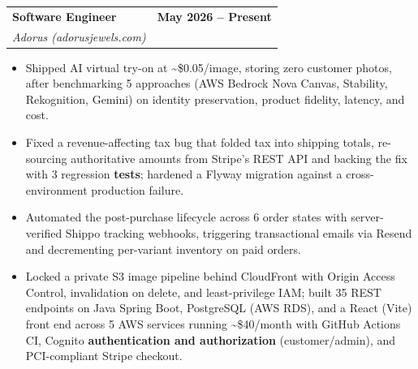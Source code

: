 \documentclass[letterpaper,10pt]{article}
\makeatletter
\newcommand{\nk}{\kern0pt}
\newcommand{\resumeItem}[1]{
  \item\small{
    {#1 \vspace{-3pt}}
  }
}
\newcommand{\resumeSubheading}[4]{
  \vspace{-2pt}\item
    \begin{tabular*}{0.97\textwidth}[t]{l@{\extracolsep{\fill}}r}
      \textbf{#1} & \textbf{#2} \\   %
      \textit{\small#3} & \textit{\small #4} \\
    \end{tabular*}\vspace{-7pt}
}
\newcommand{\resumeItemListStart}{\begin{itemize}}
\newcommand{\resumeItemListEnd}{\end{itemize}\vspace{-7pt}}
\makeatother
\begin{document}
    \resumeSubheading
      {Software Engineer}{May 2026 -- Present}
      {Adorus (adorusjewels.com)}{}
      \resumeItemListStart
        \resumeItem{Shipped AI virtual try-on at \textasciitilde\$0.05/image, storing zero customer photos, after benchmarking 5 approaches (A\nk WS Bedrock Nova Canvas, Stability, Rekognition, Gemini) on identity preservation, product fidelity, latency, and cost.}
        \resumeItem{Fixed a revenue-affecting tax bug that folded tax into shipping totals, re-sourcing authoritative amounts from Stripe's REST API and backing the fix with 3 regression \textbf{tests}; hardened a Flyway migration against a cross-environment production failure.}
        \resumeItem{Automated the post-purchase lifecycle across 6 order states with server-verified Shippo tracking webhooks, triggering transactional emails via Resend and decrementing per-variant inventory on paid orders.}
        \resumeItem{Locked a private S3 image pipeline behind CloudFront with Origin Access Control, invalidation on delete, and least-privilege IAM; built 35 REST endpoints on Java Spring Boot, PostgreSQL (A\nk WS RDS), and a React (Vite) front end across 5 A\nk WS services running \textasciitilde\$40/month with GitHub Actions CI, Cognito \textbf{authentication and authorization} (customer/admin), and PCI-compliant Stripe checkout.}
      \resumeItemListEnd
\end{document}
